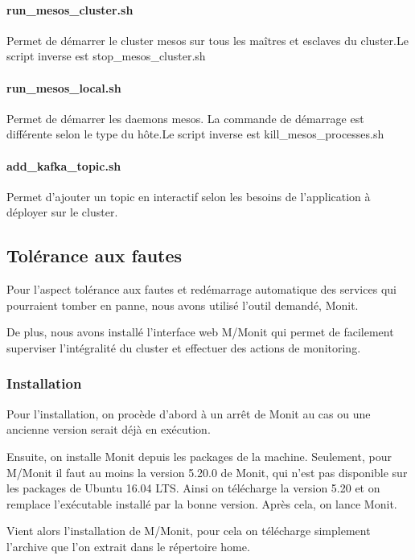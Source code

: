 \documentclass[a4paper, 11pt, titlepage]{article}
\begin{document}
\paragraph{run\_mesos\_cluster.sh}
Permet de démarrer le cluster mesos sur tous les maîtres et esclaves du cluster.Le script inverse est stop\_mesos\_cluster.sh

\paragraph{run\_mesos\_local.sh}
Permet de démarrer les daemons mesos. La commande de démarrage est différente selon le type du hôte.Le script inverse est kill\_mesos\_processes.sh

\paragraph{add\_kafka\_topic.sh}
Permet d’ajouter un topic en interactif  selon les besoins de l’application à déployer sur le cluster.



\subsection {Tolérance aux fautes}

Pour l'aspect tolérance aux fautes et redémarrage automatique des services qui pourraient tomber en panne, nous avons utilisé l'outil demandé, Monit.

De plus, nous avons installé l'interface web M/Monit qui permet de facilement superviser l'intégralité du cluster et effectuer des actions de monitoring.


\subsubsection {Installation}

Pour l'installation, on procède d'abord à un arrêt de Monit au cas ou une ancienne version serait déjà en exécution.

Ensuite, on installe Monit depuis les packages de la machine. Seulement, pour M/Monit il faut au moins la version 5.20.0 de Monit, qui n'est pas disponible sur les packages de Ubuntu 16.04 LTS. Ainsi on télécharge la version 5.20 et on remplace l'exécutable installé par la bonne version. Après cela, on lance Monit.

Vient alors l'installation de M/Monit, pour cela on télécharge simplement l'archive que l'on extrait dans le répertoire home.
\end{document}
